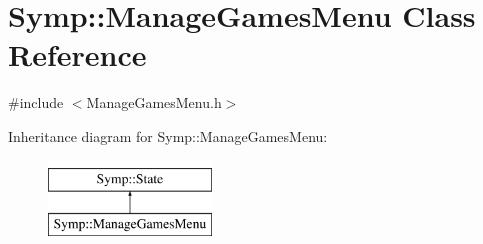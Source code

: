 \hypertarget{class_symp_1_1_manage_games_menu}{\section{Symp\-:\-:Manage\-Games\-Menu Class Reference}
\label{class_symp_1_1_manage_games_menu}
}


{\ttfamily \#include $<$Manage\-Games\-Menu.\-h$>$}

Inheritance diagram for Symp\-:\-:Manage\-Games\-Menu\-:\begin{figure}[H]
\begin{center}
\leavevmode
\includegraphics[height=2.000000cm]{class_symp_1_1_manage_games_menu}
\end{center}
\end{figure}
